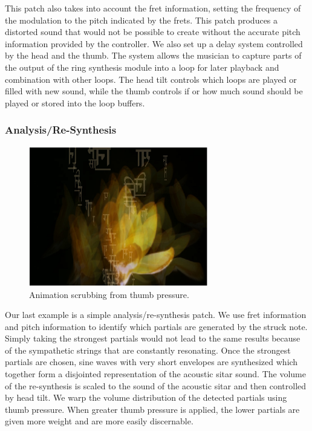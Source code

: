 This patch also takes into account the
fret information, setting the frequency of the modulation to the pitch indicated
by the frets. This patch produces a distorted sound that would not be possible to
create without the accurate pitch information provided by the controller. We also
set up a delay system controlled by the head and the thumb. The system allows the
musician to capture parts of the output of the ring synthesis module into a loop
for later playback and combination with other loops. The head tilt controls which
loops are played or filled with new sound, while the thumb controls if or how
much sound should be played or stored into the loop buffers.

\subsubsection{Analysis/Re-Synthesis}


\begin{figure}[t]
\centering
\includegraphics[width=78mm]{img-9-eps-converted-to-crop.pdf}      
\caption{Animation scrubbing from thumb pressure.}
\label{Kapur:img-9}       %
\end{figure}


Our last example is a simple
analysis/re-synthesis patch. We use fret information and pitch information to
identify which partials are generated by the struck note. Simply taking the
strongest partials would not lead to the same results because of the sympathetic
strings that are constantly resonating. Once the strongest partials are chosen,
sine waves with very short envelopes are synthesized which together form a
disjointed representation of the acoustic sitar sound. The volume of the
re-synthesis is scaled to the sound of the acoustic sitar and then controlled by
head tilt. We warp the volume distribution of the detected partials using thumb
pressure. When greater thumb pressure is applied, the lower partials are given
more weight and are more easily discernable.


